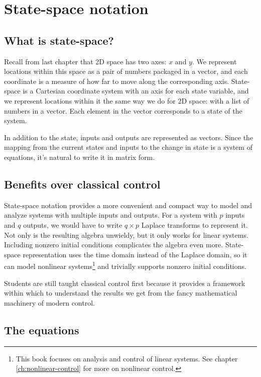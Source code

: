 \section{State-space notation}

\subsection{What is state-space?}

Recall from last chapter that 2D space has two axes: $x$ and $y$. We represent
locations within this space as a pair of numbers packaged in a vector, and each
coordinate is a measure of how far to move along the corresponding axis.
State-space is a Cartesian coordinate system with an axis for each \gls{state}
variable, and we represent locations within it the same way we do for 2D space:
with a list of numbers in a vector. Each element in the vector corresponds to a
\gls{state} of the \gls{system}.

In addition to the \gls{state}, \glspl{input} and \glspl{output} are represented
as vectors. Since the mapping from the current \glspl{state} and \glspl{input}
to the change in \gls{state} is a system of equations, it's natural to write it
in matrix form.

\subsection{Benefits over classical control}

State-space notation provides a more convenient and compact way to model and
analyze \glspl{system} with multiple \glspl{input} and \glspl{output}. For a
\gls{system} with $p$ \glspl{input} and $q$ \glspl{output}, we would have to
write $q \times p$ Laplace transforms to represent it. Not only is the resulting
algebra unwieldy, but it only works for linear \glspl{system}. Including nonzero
initial conditions complicates the algebra even more. State-space representation
uses the time domain instead of the Laplace domain, so it can model nonlinear
\glspl{system}\footnote{This book focuses on analysis and control of linear
\glspl{system}. See chapter \ref{ch:nonlinear-control} for more on nonlinear
control.} and trivially supports nonzero initial conditions.

Students are still taught classical control first because it provides a
framework within which to understand the results we get from the fancy
mathematical machinery of modern control.

\subsection{The equations}

